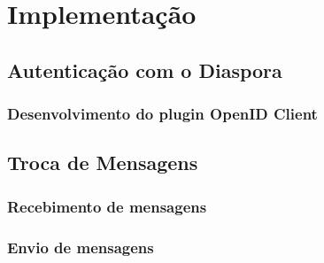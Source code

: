 \chapter{Implementação}

\section{Autenticação com o Diaspora}




\subsection{Desenvolvimento do plugin OpenID Client}



\section{Troca de Mensagens}



\subsection{Recebimento de mensagens}



\subsection{Envio de mensagens}

